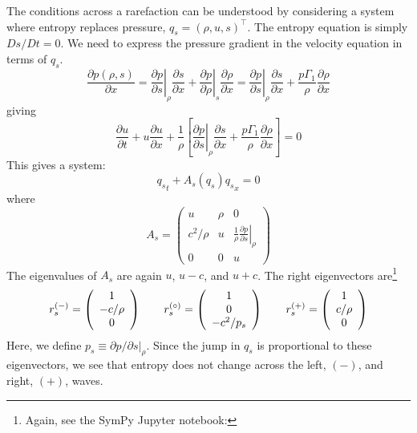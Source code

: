 The conditions across a rarefaction can be understood by considering
a system where entropy replaces pressure, $q_s = (\rho, u, s)^\intercal$.
The entropy equation is simply $Ds/Dt = 0$.  We need to express the
pressure gradient in the velocity equation in terms of $q_s$.
\begin{equation}
\frac{\partial p(\rho, s)}{\partial x} =
  \left . \frac{\partial p}{\partial s} \right |_\rho \frac{\partial s}{\partial x} +
  \left . \frac{\partial p}{\partial \rho} \right |_s \frac{\partial \rho}{\partial x}
=
  \left . \frac{\partial p}{\partial s} \right |_\rho \frac{\partial s}{\partial x} +
  \frac{p\Gamma_1}{\rho} \frac{\partial \rho}{\partial x}
\end{equation}
giving
\begin{equation}
\frac{\partial u}{\partial t} + u \frac{\partial u}{\partial x} + \frac{1}{\rho} \left [
     \left . \frac{\partial p}{\partial s} \right |_\rho \frac{\partial s}{\partial x} +
          \frac{p\Gamma_1}{\rho} \frac{\partial \rho}{\partial x} \right ] = 0
\end{equation}
This gives a system:
\begin{equation}
{q_s}_t + A_s(q_s) {q_s}_x = 0
\end{equation}
where
\begin{equation}
A_s =
 \left ( \begin{array}{ccc} u & \rho & 0 \\
        c^2/\rho & u & \frac{1}{\rho} \left . \frac{\partial p}{\partial s}\right |_\rho \\
        0 & 0 & u \end{array} \right )
\end{equation}
The eigenvalues of $A_s$ are again $u$, $u-c$, and $u+c$.  The right eigenvectors
are\footnote{Again, see the {\sf SymPy} {\sf Jupyter} notebook:
}
\begin{align}
r_s^\evm = \left ( \begin{array}{c} 1 \\ -c/\rho \\ 0 \end{array} \right )
%
\qquad
r_s^\evz = \left ( \begin{array}{c} 1 \\ 0 \\ -c^2/p_s  \end{array} \right )
%
\qquad
r_s^\evp = \left ( \begin{array}{c} 1 \\ c/\rho \\ 0 \end{array} \right )
\end{align}
Here, we define $p_s \equiv \partial p/\partial s |_\rho$.
Since the jump in $q_s$ is proportional to these eigenvectors, we see that
entropy does not change across the left, $(-)$, and right, $(+)$, waves.

